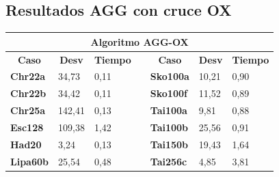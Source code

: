 \documentclass[a4paper, 12pt]{article}
\begin{document}
		
	  \newpage
      \subsection{Resultados AGG con cruce OX}
      \begin{table}[H]
\centering
\label{my-label}
\begin{tabular}{|l|l|l|l|l|l|l|}
\hline
\multicolumn{7}{|c|}{\textbf{Algoritmo AGG-OX}}                                                                                                                                                             \\ \hline
\multicolumn{1}{|c|}{\textbf{Caso}} & \multicolumn{1}{c|}{\textbf{Desv}} & \multicolumn{1}{c|}{\textbf{Tiempo}} & \multicolumn{1}{c|}{} & \multicolumn{1}{c|}{\textbf{Caso}} & \multicolumn{1}{c|}{\textbf{Desv}} & \multicolumn{1}{c|}{\textbf{Tiempo}} \\ \cline{1-3} \cline{5-7} 
\textbf{Chr22a}                     & 34,73                     & 0,11                        &                       & \textbf{Sko100a}                   & 10,21                     & 0,90                        \\ \cline{1-3} \cline{5-7} 
\textbf{Chr22b}                     & 34,42                     & 0,11                        &                       & \textbf{Sko100f}                   & 11,52                     & 0,89                        \\ \cline{1-3} \cline{5-7} 
\textbf{Chr25a}                     & 142,41                    & 0,13                        &                       & \textbf{Tai100a}                   & 9,81                      & 0,88                        \\ \cline{1-3} \cline{5-7} 
\textbf{Esc128}                     & 109,38                    & 1,42                        &                       & \textbf{Tai100b}                   & 25,56                     & 0,91                        \\ \cline{1-3} \cline{5-7} 
\textbf{Had20}                      & 3,24                      & 0,13                        &                       & \textbf{Tai150b}                   & 19,43                     & 1,64                        \\ \cline{1-3} \cline{5-7} 
\textbf{Lipa60b}                    & 25,54                     & 0,48                        &                       & \textbf{Tai256c}                   & 4,85                      & 3,81                        \\ \cline{1-3} \cline{5-7} 

\end{tabular}
\end{table}
\end{document}
